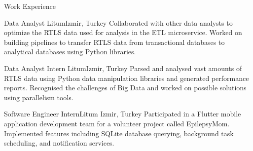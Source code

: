 \begin{Section}{Work Experience}

    {Data Analyst}
    {Litum}{Izmir, Turkey}
    {Collaborated with other data analysts to optimize the RTLS data used for analysis in the ETL microservice.}
    {Worked on building pipelines to transfer RTLS data from transactional databases to analytical databases using Python libraries.}

    {Data Analyst Intern}
    {Litum}{Izmir, Turkey}
    {Parsed and analysed vast amounts of RTLS data using Python data manipulation libraries and generated performance reports.} {Recognised the challenges of Big Data and worked on possible solutions using parallelism tools.}

    {Software Engineer Intern}{Litum}
    {Izmir, Turkey}
    {Participated in a Flutter mobile application development team for a volunteer project called EpilepsyMom.}
    {Implemented features including SQLite database querying, background task scheduling, and notification services.}

\end{Section}